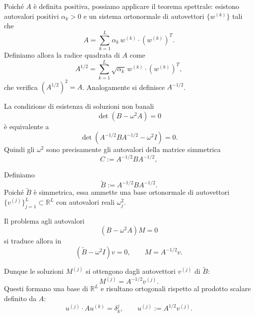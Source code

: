 Poiché $A$ è definita positiva, possiamo applicare il teorema spettrale: esistono autovalori positivi $\alpha_k>0$ e un sistema ortonormale di autovettori $\{w^{(k)}\}$ tali che
\begin{equation}
    A = \sum_{k=1}^L \alpha_k \, w^{(k)} \cdot (w^{(k)})^T.
\end{equation}
Definiamo allora la radice quadrata di $A$ come
\begin{equation}
    A^{1/2} = \sum_{k=1}^L \sqrt{\alpha_k} \, w^{(k)} \cdot (w^{(k)})^T,
\end{equation}
che verifica $(A^{1/2})^2 = A$. Analogamente si definisce $A^{-1/2}$.

La condizione di esistenza di soluzioni non banali
\begin{equation}
    \det(B - \omega^2 A) = 0
\end{equation}
è equivalente a
\begin{equation}
    \det(A^{-1/2} B A^{-1/2} - \omega^2 I) = 0.
\end{equation}
Quindi gli $\omega^2$ sono precisamente gli autovalori della matrice simmetrica
\begin{equation}
    C := A^{-1/2} B A^{-1/2},
\end{equation}

Definiamo
\begin{equation}
    \tilde{B} := A^{-1/2} B A^{-1/2}.
\end{equation}
Poiché $\tilde{B}$ è simmetrica, essa ammette una base ortonormale di autovettori $\{v^{(j)}\}_{j=1}^L \subset \mathbb{R}^L$ con autovalori reali $\omega_j^2$.  

Il problema agli autovalori
\begin{equation}
    (B - \omega^2 A)M = 0
\end{equation}
si traduce allora in
\begin{equation}
    (\tilde{B} - \omega^2 I)v = 0, 
    \qquad M = A^{-1/2} v.
\end{equation}

Dunque le soluzioni $M^{(j)}$ si ottengono dagli autovettori $v^{(j)}$ di $\tilde{B}$:
\begin{equation}
    M^{(j)} = A^{-1/2} v^{(j)}.
\end{equation}
Questi formano una base di $\mathbb{R}^L$ e risultano ortogonali rispetto al prodotto scalare definito da $A$:
\begin{equation}
    u^{(j)} \cdot A u^{(k)} = \delta^j_k, 
    \qquad u^{(j)} := A^{1/2} v^{(j)}.
\end{equation}

